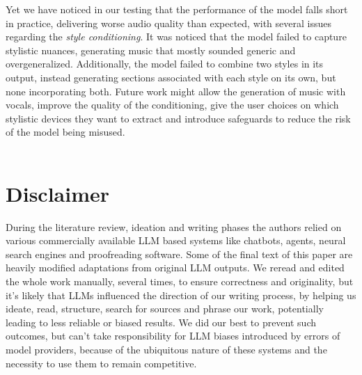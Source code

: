 \documentclass[a4paper,12pt,twoside]{article}
\begin{document}
Yet we have noticed in our testing that the performance of the model falls short in practice, delivering worse audio quality than expected, with several issues regarding the \textit{style conditioning}. It was noticed that the model failed to capture stylistic nuances, generating music that mostly sounded generic and overgeneralized. Additionally, the model failed to combine two styles in its output, instead generating sections associated with each style on its own, but none incorporating both. Future work might allow the generation of music with vocals, improve the quality of the conditioning, give the user choices on which stylistic devices they want to extract and introduce safeguards to reduce the risk of the model being misused. \\ \


\section{Disclaimer}

During the literature review, ideation and writing phases the authors relied on various commercially available LLM based systems like chatbots, agents, neural search engines and proofreading software. Some of the final text of this paper are heavily modified adaptations from original LLM outputs. We reread and edited the whole work manually, several times, to ensure correctness and originality, but it's likely that LLMs influenced the direction of our writing process, by helping us ideate, read, structure, search for sources and phrase our work, potentially leading to less reliable or biased results. We did our best to prevent such outcomes, but can't take responsibility for LLM biases introduced by errors of model providers, because of the ubiquitous nature of these systems and the necessity to use them to remain competitive.

\newpage


\end{document}

